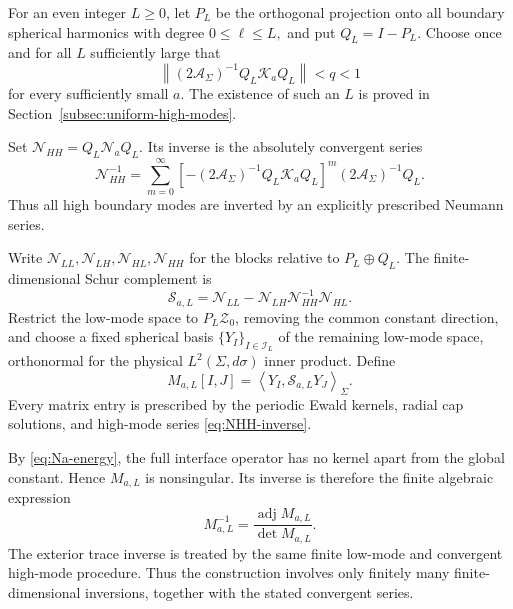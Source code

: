 \documentclass[11pt,a4paper,twoside]{article}
\numberwithin{equation}{section}
\theoremstyle{definition}
\theoremstyle{remark}
\begin{document}
For an even integer \(L\ge0\), let \(P_L\) be the orthogonal projection onto all boundary spherical harmonics
with degree \(0\le\ell\le L,\) and put \(Q_L=I-P_L.\) Choose once and for all \(L\) sufficiently large that
\begin{equation}\label{eq:high-mode-small}
\left\|
(2\mathcal A_\Sigma)^{-1}
Q_L\mathcal K_aQ_L
\right\|
<q<1
\end{equation}
for every sufficiently small \(a\).  The existence of such an \(L\)
is proved in
Section~\ref{subsec:uniform-high-modes}.

Set \(\mathcal N_{HH} = Q_L\mathcal N_aQ_L.\) Its inverse is the absolutely convergent series
\begin{equation}\label{eq:NHH-inverse}
\mathcal N_{HH}^{-1}
=
\sum_{m=0}^{\infty}
\left[
-(2\mathcal A_\Sigma)^{-1}
Q_L\mathcal K_aQ_L
\right]^m
(2\mathcal A_\Sigma)^{-1}Q_L.
\end{equation}
Thus all high boundary modes are inverted by an explicitly prescribed
Neumann series.

Write \(\mathcal N_{LL},\mathcal N_{LH},\mathcal N_{HL},
\mathcal N_{HH}\) for the blocks relative to \(P_L\oplus Q_L\).
The finite-dimensional Schur complement is
\[
\mathcal S_{a,L}
=
\mathcal N_{LL}
-
\mathcal N_{LH}
\mathcal N_{HH}^{-1}
\mathcal N_{HL}.
\]
Restrict the low-mode space to \(P_L\mathcal Z_0\), removing
the common constant direction, and choose a fixed spherical basis \(\{Y_I\}_{I\in\mathcal I_L}\) of the remaining low-mode space, orthonormal for the physical
\(L^2(\Sigma,d\sigma)\) inner product. Define
\begin{equation}\label{eq:M-a-L}
M_{a,L}[I,J]
=
\left\langle
Y_I,
\mathcal S_{a,L}Y_J
\right\rangle_\Sigma.
\end{equation}
Every matrix entry is prescribed by the periodic Ewald kernels,
radial cap solutions, and high-mode series \eqref{eq:NHH-inverse}.

By \eqref{eq:Na-energy}, the full interface operator has no kernel
apart from the global constant.  Hence \(M_{a,L}\) is nonsingular.  Its inverse is therefore the finite algebraic
expression
\begin{equation}\label{eq:M-inverse}
M_{a,L}^{-1}
=
\frac{
\operatorname{adj}M_{a,L}
}{
\det M_{a,L}
}.
\end{equation}
The exterior trace inverse is treated by the same finite low-mode
and convergent high-mode procedure. Thus the construction involves
only finitely many finite-dimensional inversions, together with the
stated convergent series.
\end{document}
